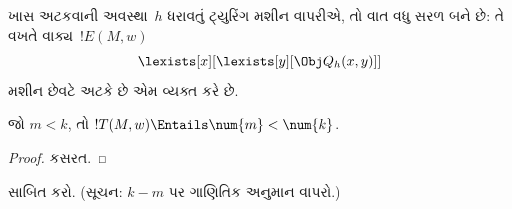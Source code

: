 ખાસ અટકવાની અવસ્થા~$h$ ધરાવતું ટ્યુરિંગ મશીન
વાપરીએ, તો વાત વધુ સરળ બને છે: તે વખતે
વાક્ય~$!E(M, w)$
\[
\lexists[x][\lexists[y][\Obj Q_h(x, y)]]
\]
મશીન છેવટે અટકે છે એમ વ્યક્ત કરે છે.

\begin{prop}
જો $m < k$, તો $!T(M, w) \Entails \num{m} < \num{k}$.
\end{prop}

\begin{proof}
કસરત.
\end{proof}

\begin{prob}
 સાબિત કરો.
(સૂચન: $k-m$ પર ગાણિતિક અનુમાન વાપરો.)
\end{prob}
\endgroup


\begingroup
\makeatletter{}\makeatother

\label{guunit:OLP-0271}


